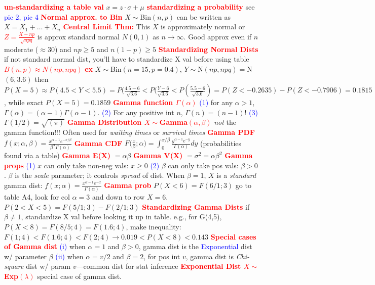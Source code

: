 \documentclass[9pt]{extarticle}
\newcommand{\re}[1]{\textcolor{red}{\textbf{#1}}}
\newcommand{\bt}[1]{\textcolor{blue}{#1}}
\begin{document}
	\re{un-standardizing a table val} $x=z\cdot \sigma + \mu$
	\re{standardizing a probability} see \bt{pic 2, pic 4}
	\re{Normal approx. to Bin} $X\mathtt{\sim}$Bin$(n,p)$ can be written as
	$X=X_{1}+\ldots+X_{n}$
	\re{Central Limit Thm:} This $X$ is approximately normal or
	\re{$Z=\frac{X-np}{\sqrt{npq}}$} is approx standard normal $N(0,1)$ as
	$n\rightarrow\infty$. Good approx even if $n$ moderate ($\approx$30) and
	$np\geq5$ and $n(1-p)\geq 5$
	\re{Standardizing Normal Dists} if not standard normal dist, you'll have to
	standardize X val before using table
	\re{$B(n,p)\approx N(np,npq)$}
	\re{ex} $X\mathtt{\sim}$Bin$(n=15,p=0.4)$, $Y\mathtt{\sim}$N$(np,npq)=$N$(6,3.6)$
	then $P(X=5)\approx P(4.5<Y<5.5) =
	P(\frac{4.5-6}{\sqrt{3.6}} < P(\frac{Y-6}{\sqrt{3.6}}
							   < P(\frac{5.5-6}{\sqrt{3.6}})
							   		 = P(Z<-0.2635) - P(Z<-0.7906)
									 = 0.1815$, while exact $P(X=5)=0.1859$
	\re{Gamma function $\Gamma (\alpha)$}
	\bt{(1)} for any $\alpha>1$, $\Gamma (\alpha)
	= (\alpha - 1)\Gamma(\alpha - 1)$.
	\bt{(2)} For any positive int $n$, $\Gamma(n) = (n-1)!$
	\bt{(3)} $\Gamma(1/2) = \sqrt{(\pi)}$
	\re{Gamma Distribution $X\mathtt{\sim}$Gamma$(\alpha,\beta)$} \emph{not} the gamma
	function!!! Often used for \emph{waiting times} or \emph{survival times}
	\re{Gamma PDF} $f(x;\alpha,\beta)
					= \frac{x^{\alpha-1}e^{-x/\beta}}{\beta^{\alpha}\Gamma(\alpha)}$
	\re{Gamma CDF} $F\Big(\frac{x}{\beta}; \alpha\Big)
					 = \int_{0}^{x/\beta}\frac{y^{\alpha - 1}e^{-y}}{\Gamma(\alpha)}dy$
					 (probabilities found via a table)
	\re{Gamma E(X)} $=\alpha\beta$
	\re{Gamma V(X)} $=\sigma^{2}=\alpha\beta^{2}$
	\re{Gamma props}
	\bt{(1)} $x$ can only take non-neg vals: $x\geq 0$
	\bt{(2)} $\beta$ can only take pos vals: $\beta > 0$. $\beta$ is the \emph{scale}
	parameter; it controls \emph{spread} of dist. When $\beta=1$, $X$ is a
	\emph{standard} gamma dist: $f(x;\alpha)=\frac{x^{\alpha-1}e^{-x}}{\Gamma(\alpha)}$
	\re{Gamma prob} $P(X<6)=F(6/1;3)$ go to table A4, look for col $\alpha=3$ and down
	to row $X=6$. $P(2<X<5)=F(5/1;3)-F(2/1;3)$
	\re{Standardizing Gamma Dists} if $\beta\neq 1$, standardize X val before looking
	it up in table. e.g., for G(4,5), $P(X<8) = F(8/5;4) = F(1.6;4)$, make
	inequality: $F(1;4) < F(1.6;4) < F(2;4) \rightarrow 0.019 < P(X<8) < 0.143$
	\re{Special cases of Gamma dist}
	\bt{(i)} when $\alpha=1$ and $\beta>0$, gamma dist is
	the \bt{Exponential} dist w/ parameter $\beta$
	\bt{(ii)} when $\alpha=v/2$ and $\beta=2$, for pos int $v$, gamma dist is
	\emph{Chi-square} dist w/ param $v$---common dist for stat inference
	\re{Exponential Dist $X\mathtt{\sim}$Exp$(\lambda)$} special case of gamma dist.
\end{document}
